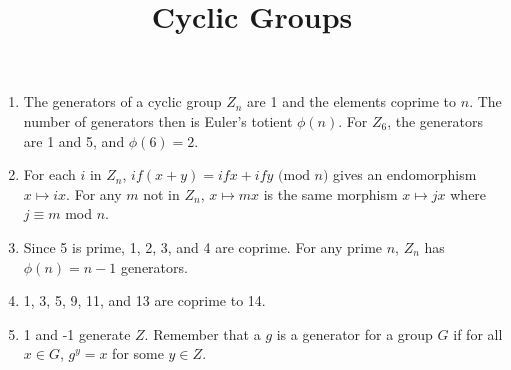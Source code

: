 \documentclass[english]{article}
\begin{document}
	\title{Cyclic Groups}
	\maketitle
\begin{enumerate}
\item The generators of a cyclic group $Z_{n}$ are 1 and the elements coprime
to $n$. The number of generators then is Euler's totient $\phi(n)$.
For $Z_{6}$, the generators are 1 and 5, and $\phi(6)=2$. 
\item For each $i$ in $Z_{n}$, $if(x+y)=ifx+ify\text{ (mod }n)$ gives
an endomorphism $x\mapsto ix$. For any $m$ not in $Z_{n}$, $x\mapsto mx$
is the same morphism $x\mapsto jx$ where $j\equiv m$ mod $n$. 
\item Since 5 is prime, 1, 2, 3, and 4 are coprime. For any prime $n$,
$Z_{n}$ has $\phi(n)=n-1$ generators.
\item 1, 3, 5, 9, 11, and 13 are coprime to 14.
\item 1 and -1 generate $Z$. Remember that a $g$ is a generator for a
group $G$ if for all $x\in G$, $g^{y}=x$ for some $y\in Z$. 
\end{enumerate}
\end{document}
